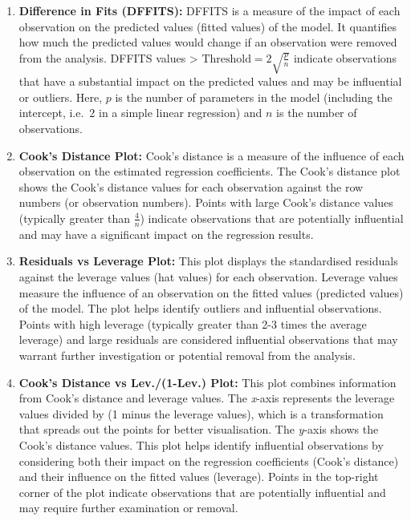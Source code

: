 \documentclass[
  letterpaper,
]{book}
\begin{document}
\begin{enumerate}
\def\labelenumi{\arabic{enumi}.}
\item
  \textbf{Difference in Fits (DFFITS):} DFFITS is a measure of the
  impact of each observation on the predicted values (fitted values) of
  the model. It quantifies how much the predicted values would change if
  an observation were removed from the analysis. DFFITS values
  \textgreater{} \(\text{Threshold} = 2 \sqrt{\frac{p}{n}}\) indicate
  observations that have a substantial impact on the predicted values
  and may be influential or outliers. Here, \(p\) is the number of
  parameters in the model (including the intercept, i.e.~2 in a simple
  linear regression) and \(n\) is the number of observations.
\item
  \textbf{Cook's Distance Plot:} Cook's distance is a measure of the
  influence of each observation on the estimated regression
  coefficients. The Cook's distance plot shows the Cook's distance
  values for each observation against the row numbers (or observation
  numbers). Points with large Cook's distance values (typically greater
  than \(\frac{4}{n}\)) indicate observations that are potentially
  influential and may have a significant impact on the regression
  results.
\item
  \textbf{Residuals vs Leverage Plot:} This plot displays the
  standardised residuals against the leverage values (hat values) for
  each observation. Leverage values measure the influence of an
  observation on the fitted values (predicted values) of the model. The
  plot helps identify outliers and influential observations. Points with
  high leverage (typically greater than 2-3 times the average leverage)
  and large residuals are considered influential observations that may
  warrant further investigation or potential removal from the analysis.
\item
  \textbf{Cook's Distance vs Lev./(1-Lev.) Plot:} This plot combines
  information from Cook's distance and leverage values. The
  \emph{x}-axis represents the leverage values divided by (1 minus the
  leverage values), which is a transformation that spreads out the
  points for better visualisation. The \emph{y}-axis shows the Cook's
  distance values. This plot helps identify influential observations by
  considering both their impact on the regression coefficients (Cook's
  distance) and their influence on the fitted values (leverage). Points
  in the top-right corner of the plot indicate observations that are
  potentially influential and may require further examination or
  removal.
\end{enumerate}
\end{document}
